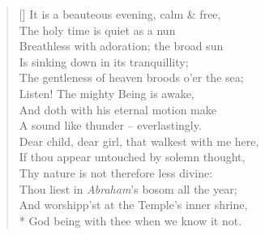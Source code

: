\documentclass[MAIN]{subfiles}
\begin{document}
\settowidth{\versewidth}{It is a beauteous evening, calm \& free,}
\begin{verse}[\versewidth]
It is a beauteous evening, calm \& free,\\
\vin The holy time is quiet as a nun\\
\vin Breathless with adoration; the broad sun\\
Is sinking down in its tranquillity;\\
The gentleness of heaven broods o'er the sea;\\
\vin Listen! The mighty Being is awake,\\
\vin And doth with his eternal motion make\\
A sound like thunder -- everlastingly.\\
Dear child, dear girl, that walkest with me here,\\
\vin If thou appear untouched by solemn thought,\\
\vin \vin Thy nature is not therefore less divine:\\
Thou liest in \emph{Abraham}'s bosom all the year;\\
\vin \vin And worshipp'st at the Temple's inner shrine,\\*
\vin God being with thee when we know it not. 
\end{verse}
\end{document}
